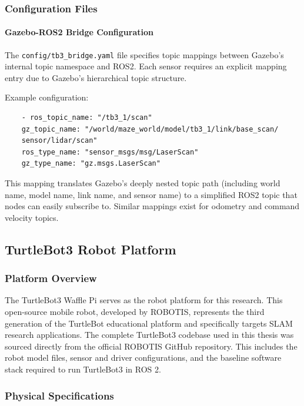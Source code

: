 \documentclass[11pt]{article}
\begin{document}
\subsubsection{Configuration Files}

\paragraph{Gazebo-ROS2 Bridge Configuration}

The \texttt{config/tb3\_bridge.yaml} file specifies topic mappings between Gazebo's internal topic namespace and ROS2. Each sensor requires an explicit mapping entry due to Gazebo's hierarchical topic structure.

Example configuration:
\begin{verbatim}
	- ros_topic_name: "/tb3_1/scan"
	gz_topic_name: "/world/maze_world/model/tb3_1/link/base_scan/
	sensor/lidar/scan"
	ros_type_name: "sensor_msgs/msg/LaserScan"
	gz_type_name: "gz.msgs.LaserScan"
\end{verbatim}

This mapping translates Gazebo's deeply nested topic path (including world name, model name, link name, and sensor name) to a simplified ROS2 topic that nodes can easily subscribe to. Similar mappings exist for odometry and command velocity topics.

\subsection{TurtleBot3 Robot Platform}

\subsubsection{Platform Overview}

The TurtleBot3 Waffle Pi serves as the robot platform for this research. This open-source mobile robot, developed by ROBOTIS, represents the third generation of the TurtleBot educational platform and specifically targets SLAM research applications. The complete TurtleBot3 codebase used in this thesis was sourced directly from the official ROBOTIS GitHub repository. This includes the robot model files, sensor and driver configurations, and the baseline software stack required to run TurtleBot3 in ROS 2.

\subsubsection{Physical Specifications}
\end{document}
